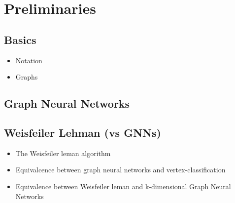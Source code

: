 \section{Preliminaries}

\subsection{Basics}
\begin{itemize}
    \item Notation
    \item Graphs
\end{itemize}

\subsection{Graph Neural Networks}

\subsection{Weisfeiler Lehman (vs GNNs)}

\begin{itemize}
    \item The Weisfeiler leman algorithm 

    \item Equivalcence between graph neural networks and vertex-classification
    
    \item Equivalence between Weisfeiler leman and k-dimensional Graph Neural Networks 

\end{itemize}